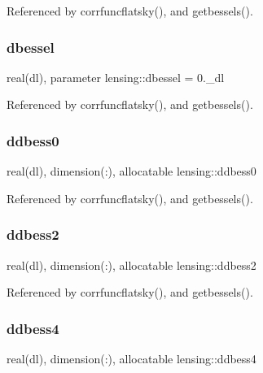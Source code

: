 Referenced by corrfuncflatsky(), and getbessels().

\mbox{\label{namespacelensing_a4f43eba14b18981f0f0bff9a117122fe}} 
\subsubsection{\texorpdfstring{dbessel}{dbessel}}
{\footnotesize\ttfamily real(dl), parameter lensing\+::dbessel = 0.\+\_\+dl\hspace{0.3cm}{\ttfamily [private]}}



Referenced by corrfuncflatsky(), and getbessels().

\mbox{\label{namespacelensing_aaa35de68ce5b9c6b986ebdf536468c80}} 
\subsubsection{\texorpdfstring{ddbess0}{ddbess0}}
{\footnotesize\ttfamily real(dl), dimension(\+:), allocatable lensing\+::ddbess0\hspace{0.3cm}{\ttfamily [private]}}



Referenced by corrfuncflatsky(), and getbessels().

\mbox{\label{namespacelensing_a18c643c5ab84df5ac5f56ee6d426ffa7}} 
\subsubsection{\texorpdfstring{ddbess2}{ddbess2}}
{\footnotesize\ttfamily real(dl), dimension(\+:), allocatable lensing\+::ddbess2\hspace{0.3cm}{\ttfamily [private]}}



Referenced by corrfuncflatsky(), and getbessels().

\mbox{\label{namespacelensing_a1f5bffd45d988c4c941031621cd0c266}} 
\subsubsection{\texorpdfstring{ddbess4}{ddbess4}}
{\footnotesize\ttfamily real(dl), dimension(\+:), allocatable lensing\+::ddbess4\hspace{0.3cm}{\ttfamily [private]}}



